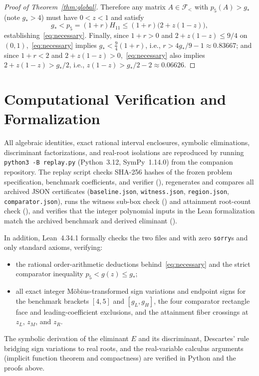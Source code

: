 \documentclass[11pt]{article}
\theoremstyle{remark}
\begin{document}
\begin{proof}[Proof of Theorem~\ref{thm:global}]
Therefore any matrix $A\in\mathcal{F}_{<}$ with $p_5(A)>g_*$ (note $g_*>4$)
must have $0<z<1$ and satisfy
\[
  g_* < p_5 = (1+r)H_{11} \le (1+r)\bigl(2+z(1-z)\bigr),
\]
establishing~\eqref{eq:necessary}. Finally, since $1+r>0$ and
$2+z(1-z)\le 9/4$ on $(0,1)$,~\eqref{eq:necessary} implies
$g_* < \frac{9}{4}(1+r)$, i.e., $r > 4g_*/9 - 1 \approx 0.83667$; and since
$1+r<2$ and $2+z(1-z)>0$,~\eqref{eq:necessary} also implies
$2+z(1-z)>g_*/2$, i.e., $z(1-z) > g_*/2 - 2 \approx 0.06626$.
\end{proof}

\section{Computational Verification and Formalization}\label{sec:repro}

All algebraic identities, exact rational interval enclosures, symbolic
eliminations, discriminant factorizations, and real-root isolations are
reproduced by running \texttt{python3 -B replay.py} (Python~3.12,
SymPy~1.14.0) from the companion repository. The replay script checks SHA-256
hashes of the frozen problem specification, benchmark coefficients, and
verifier (), regenerates and compares all
archived JSON certificates (\texttt{baseline.json}, \texttt{witness.json},
\texttt{region.json}, \texttt{comparator.json}), runs the witness sub-box
check () and attainment root-count
check (), and verifies that the
integer polynomial inputs in the Lean formalization match the archived
benchmark and derived eliminant ().

In addition, Lean~4.34.1 formally checks the two files
 and
 with zero \texttt{sorry}s and only
standard axioms, verifying:
\begin{itemize}
  \item the rational order-arithmetic deductions behind~\eqref{eq:necessary}
  and the strict comparator inequality $p_5 < g(z) \le g_*$;
  \item all exact integer M\"obius-transformed sign variations and endpoint
  signs for the benchmark brackets $[4,5]$ and $[g_L,g_H]$, the four
  comparator rectangle face and leading-coefficient exclusions, and the
  attainment fiber crossings at $z_L$, $z_M$, and $z_R$.
\end{itemize}
The symbolic derivation of the eliminant $E$ and its discriminant, Descartes'
rule bridging sign variations to real roots, and the real-variable calculus
arguments (implicit function theorem and compactness) are verified in Python
and the proofs above.
\end{document}
